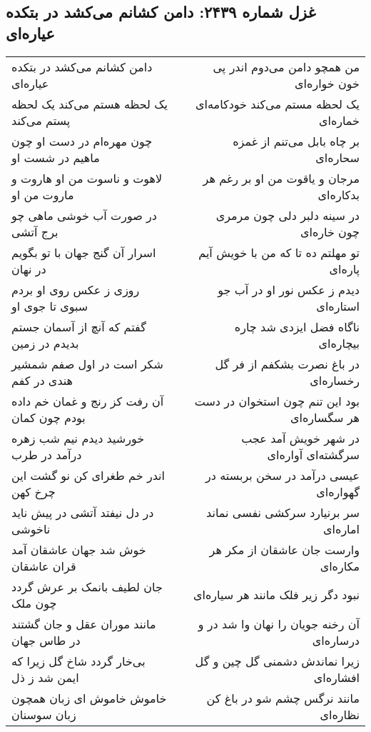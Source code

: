 \begin{center}
\section*{غزل شماره ۲۴۳۹: دامن کشانم می‌کشد در بتکده عیاره‌ای}
\label{sec:2439}
\begin{longtable}{l p{0.5cm} r}
دامن کشانم می‌کشد در بتکده عیاره‌ای
&&
من همچو دامن می‌دوم اندر پی خون خواره‌ای
\\
یک لحظه هستم می‌کند یک لحظه پستم می‌کند
&&
یک لحظه مستم می‌کند خودکامه‌ای خماره‌ای
\\
چون مهره‌ام در دست او چون ماهیم در شست او
&&
بر چاه بابل می‌تنم از غمزه سحاره‌ای
\\
لاهوت و ناسوت من او هاروت و ماروت من او
&&
مرجان و یاقوت من او بر رغم هر بدکاره‌ای
\\
در صورت آب خوشی ماهی چو برج آتشی
&&
در سینه دلبر دلی چون مرمری چون خاره‌ای
\\
اسرار آن گنج جهان با تو بگویم در نهان
&&
تو مهلتم ده تا که من با خویش آیم پاره‌ای
\\
روزی ز عکس روی او بردم سبوی تا جوی او
&&
دیدم ز عکس نور او در آب جو استاره‌ای
\\
گفتم که آنچ از آسمان جستم بدیدم در زمین
&&
ناگاه فضل ایزدی شد چاره بیچاره‌ای
\\
شکر است در اول صفم شمشیر هندی در کفم
&&
در باغ نصرت بشکفم از فر گل رخساره‌ای
\\
آن رفت کز رنج و غمان خم داده بودم چون کمان
&&
بود این تنم چون استخوان در دست هر سگساره‌ای
\\
خورشید دیدم نیم شب زهره درآمد در طرب
&&
در شهر خویش آمد عجب سرگشته‌ای آواره‌ای
\\
اندر خم طغرای کن نو گشت این چرخ کهن
&&
عیسی درآمد در سخن بربسته در گهواره‌ای
\\
در دل نیفتد آتشی در پیش ناید ناخوشی
&&
سر برنیارد سرکشی نفسی نماند اماره‌ای
\\
خوش شد جهان عاشقان آمد قران عاشقان
&&
وارست جان عاشقان از مکر هر مکاره‌ای
\\
جان لطیف بانمک بر عرش گردد چون ملک
&&
نبود دگر زیر فلک مانند هر سیاره‌ای
\\
مانند موران عقل و جان گشتند در طاس جهان
&&
آن رخنه جویان را نهان وا شد در و درساره‌ای
\\
بی‌خار گردد شاخ گل زیرا که ایمن شد ز ذل
&&
زیرا نماندش دشمنی گل چین و گل افشاره‌ای
\\
خاموش خاموش ای زبان همچون زبان سوسنان
&&
مانند نرگس چشم شو در باغ کن نظاره‌ای
\\
\end{longtable}
\end{center}
